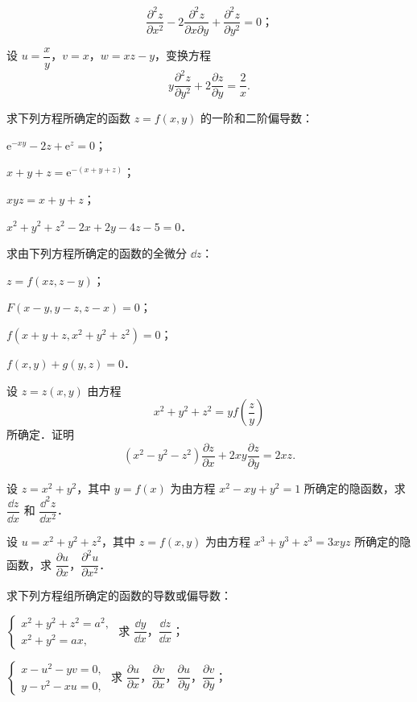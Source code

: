 \begin{xiti}
\begin{ziti}
\[
\frac{\partial^{2}z}{\partial x^{2}}-2\frac{\partial^{2}z}{\partial x\partial y}+\frac{\partial^{2}z}{\partial y^{2}}=0\text{；}
\]
\item 设 $u=\dfrac{x}{y}$，$v=x$，$w=xz-y$，变换方程
\[
y\frac{\partial^{2}z}{\partial y^{2}}+2\frac{\partial z}{\partial y}=\frac{2}{x}.
\]
\end{ziti}
\item 求下列方程所确定的函数 $z=f(x,y)$ 的一阶和二阶偏导数：
\begin{ziti}
\item $\mathrm{e}^{-xy}-2z+\mathrm{e}^{z}=0$；
\item $x+y+z=\mathrm{e}^{-(x+y+z)}$；
\item $xyz=x+y+z$；
\item $x^{2}+y^{2}+z^{2}-2x+2y-4z-5=0$．
\end{ziti}
\item 求由下列方程所确定的函数的全微分 $\dd z$：
\begin{ziti}
\item $z=f(xz,z-y)$；
\item $F(x-y,y-z,z-x)=0$；
\item $f(x+y+z,x^{2}+y^{2}+z^{2})=0$；
\item $f(x,y)+g(y,z)=0$．
\end{ziti}
\item 设 $z=z(x,y)$ 由方程
\[
x^{2}+y^{2}+z^{2}=yf\left(\frac{z}{y}\right)
\]
所确定．证明
\[
\left(x^{2}-y^{2}-z^{2}\right)\frac{\partial z}{\partial x}+2xy\frac{\partial z}{\partial y}=2xz.
\]
\item 设 $z=x^{2}+y^{2}$，其中 $y=f(x)$ 为由方程 $x^{2}-xy+y^{2}=1$ 所确定的隐函数，求 $\dfrac{\dd z}{\dd x}$ 和 $\dfrac{\dd^{2}z}{\dd x^{2}}$．
\item 设 $u=x^{2}+y^{2}+z^{2}$，其中 $z=f(x,y)$ 为由方程 $x^{3}+y^{3}+z^{3}=3xyz$ 所确定的隐函数，求 $\dfrac{\partial u}{\partial x}$，$\dfrac{\partial^{2}u}{\partial x^{2}}$．
\item 求下列方程组所确定的函数的导数或偏导数：
\begin{ziti}
\item $\left\{\begin{array}{l}x^{2}+y^{2}+z^{2}=a^{2},\\ x^{2}+y^{2}=ax,\end{array}\right.$ 求 $\dfrac{\dd y}{\dd x}$，$\dfrac{\dd z}{\dd x}$；
\item $\left\{\begin{array}{l}x-u^{2}-yv=0,\\ y-v^{2}-xu=0,\end{array}\right.$ 求 $\dfrac{\partial u}{\partial x}$，$\dfrac{\partial v}{\partial x}$，$\dfrac{\partial u}{\partial y}$，$\dfrac{\partial v}{\partial y}$；

\end{ziti}
\end{xiti}

